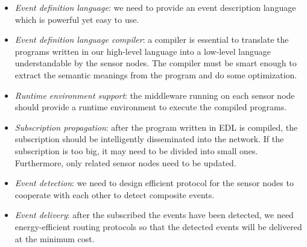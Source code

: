 \begin{itemize}
\item	\emph{Event definition language}: we need to provide an event description language which is powerful yet easy to use.
\item	\emph{Event definition language compiler}: a compiler is essential to translate the programs written in our high-level language into a low-level language understandable by the sensor nodes. The compiler must be smart enough to extract the semantic meanings from the program and do some optimization.
\item	\emph{Runtime environment support}: the middleware running on each sensor node should provide a runtime environment to execute the compiled programs.
\item	\emph{Subscription propagation}: after the program written in EDL is compiled, the subscription should be intelligently disseminated into the network. If the subscription is too big, it may need to be divided into small ones. Furthermore, only related sensor nodes need to be updated.
\item	\emph{Event detection}: we need to design efficient protocol for the sensor nodes to cooperate with each other to detect composite events.
\item	\emph{Event delivery}: after the subscribed the events have been detected, we need energy-efficient routing protocols so that the detected events will be delivered at the minimum cost.
\end{itemize}
